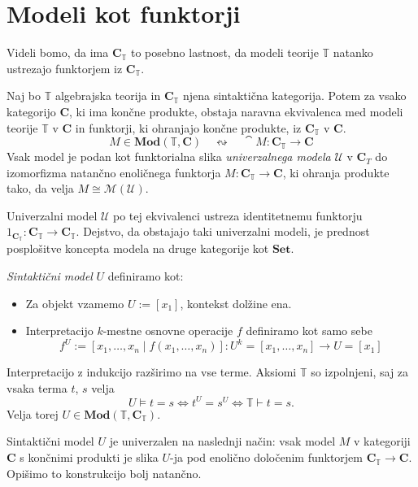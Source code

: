 \documentclass[../kategoricna_logika.tex]{subfiles}
\begin{document}
\section{Modeli kot funktorji}
%
Videli bomo, da ima $\mathbf{C}_{\mathbb{T}}$ to posebno lastnost, da modeli
teorije $\mathbb{T}$ natanko ustrezajo funktorjem iz $\mathbf{C}_{\mathbb{T}}$.
\begin{izrek}
\label{sec:modeli-kot-funtorji}
Naj bo $\mathbb{T}$ algebrajska teorija in $\mathbf{C}_{\mathbb{T}}$ njena
sintaktična kategorija. Potem za vsako kategorijo $\mathbf{C}$, ki ima končne
produkte, obstaja naravna ekvivalenca med modeli teorije $\mathbb{T}$ v
$\mathbf{C}$ in funktorji, ki ohranjajo končne produkte, iz
$\mathbf{C}_{\mathbb{T}}$ v $\mathbf{C}$.
$$M \in \mathbf{Mod}(\mathbb{T}, \mathbf{C})\quad \leftrightsquigarrow \quad \cat{M} : \mathbf{C}_\mathbb{T} \to \mathbf{C}$$
Vsak model je podan kot funktorialna slika \emph{univerzalnega modela}
$\mathcal{U}$ v $\mathbf{C}_T$ do izomorfizma natančno enoličnega funktorja
$M : \mathbf{C}_{\mathbb{T}} \to \mathbf{C}$, ki ohranja produkte tako, da velja
$M \cong \mathcal{M}(\mathcal{U})$.
\end{izrek}
\begin{opomba}
  Univerzalni model $\mathcal{U}$ po tej ekvivalenci ustreza identitetnemu
  funktorju $1_{\mathbf{C}_{\mathbb{T}}} : \mathbf{C}_{\mathbb{T}} \to \mathbf{C}_{\mathbb{T}}$.
  Dejstvo, da obstajajo taki univerzalni modeli, je prednost posplošitve
  koncepta modela na druge kategorije kot $\mathbf{Set}$.
\end{opomba}
%
\begin{definicija}
\emph{Sintaktični model} $U$ definiramo kot:
\begin{itemize}
\item Za objekt vzamemo $U := [x_1]$, kontekst dolžine ena.
%
\item Interpretacijo $k$-mestne osnovne operacije $f$ definiramo kot
  samo sebe
$$f^U := [x_1, \ldots, x_n \mid f(x_1, \ldots, x_n)] : U^k = [x_1, \ldots, x_n] \to U = [x_1]$$
\end{itemize}
%
Interpretacijo z indukcijo razširimo na vse terme.
Aksiomi $\mathbb{T}$ so izpolnjeni, saj za vsaka terma $t$, $s$ velja
$$U \models t = s \Longleftrightarrow t^U = s^U \Longleftrightarrow \mathbb{T} \vdash t = s.$$
Velja torej
$U \in \mathbf{Mod}(\mathbb{T}, \mathbf{C}_\mathbb{T})$.
\end{definicija}
%
Sintaktični model $U$ je univerzalen na naslednji način:
vsak model $M$ v kategoriji $\mathbf{C}$ s končnimi produkti je
slika $U$-ja pod enolično določenim funktorjem $\mathbf{C}_{\mathbb{T}} \to \mathbf{C}$.
Opišimo to konstrukcijo bolj natančno.
\end{document}
